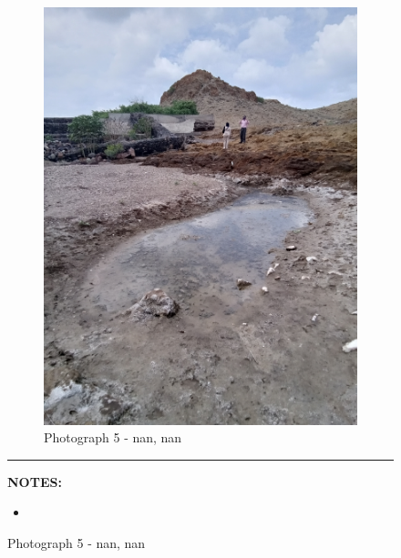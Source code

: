 \documentclass[12pt, letterpaper]{article}
\begin{document}
\begin{figure}[h]
{{                \begin{subfigure}{\linewidth}
                    \centering
                    \includegraphics[width=0.37\textheight, angle=-90]{photos/2.png}
                    \captionsetup{width=0.8\linewidth}
                    \caption{Photograph 5 - nan, nan}
                \end{subfigure}
                    \vspace{1mm}
                    \hrule
                \begin{minipage}[c][4.5cm][t]{1\textwidth} 
                    \begin{minipage}[t][2cm][t]{0.5\textwidth} 
	 				\vspace{2mm}
					\centering
					\textbf{\small{NOTES:}} \\ 
					\raggedright 
					\begin{itemize}
            					\item \footnotesize{}
       				 	\end{itemize}

\end{minipage}
\end{minipage}}}
\end{figure}
\end{document}
